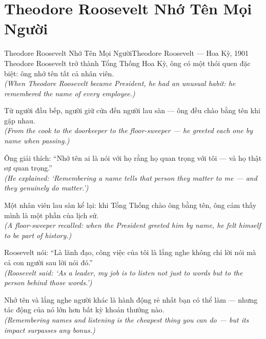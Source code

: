 \section{Theodore Roosevelt Nhớ Tên Mọi Người}
\begin{truyen}{Theodore Roosevelt Nhớ Tên Mọi Người}{Theodore Roosevelt --- Hoa Kỳ, 1901}
 Theodore Roosevelt trở thành Tổng Thống Hoa Kỳ, ông có một thói quen đặc biệt: ông nhớ tên tất cả nhân viên.\\[4pt]
\textit{(When Theodore Roosevelt became President, he had an unusual habit: he remembered the name of every employee.)}

Từ người đầu bếp, người giữ cửa đến người lau sàn --- ông đều chào bằng tên khi gặp nhau.\\[4pt]
\textit{(From the cook to the doorkeeper to the floor-sweeper --- he greeted each one by name when passing.)}

Ông giải thích: ``Nhớ tên ai là nói với họ rằng họ quan trọng với tôi --- và họ thật sự quan trọng.''\\[4pt]
\textit{(He explained: `Remembering a name tells that person they matter to me --- and they genuinely do matter.')}

Một nhân viên lau sàn kể lại: khi Tổng Thống chào ông bằng tên, ông cảm thấy mình là một phần của lịch sử.\\[4pt]
\textit{(A floor-sweeper recalled: when the President greeted him by name, he felt himself to be part of history.)}

Roosevelt nói: ``Là lãnh đạo, công việc của tôi là lắng nghe không chỉ lời nói mà cả con người sau lời nói đó.''\\[4pt]
\textit{(Roosevelt said: `As a leader, my job is to listen not just to words but to the person behind those words.')}

\end{truyen}
\begin{baihoc}
  Nhớ tên và lắng nghe người khác là hành động rẻ nhất bạn có thể làm --- nhưng tác động của nó lớn hơn bất kỳ khoản thưởng nào.\\[4pt]
  \textit{(Remembering names and listening is the cheapest thing you can do --- but its impact surpasses any bonus.)}
\end{baihoc}


